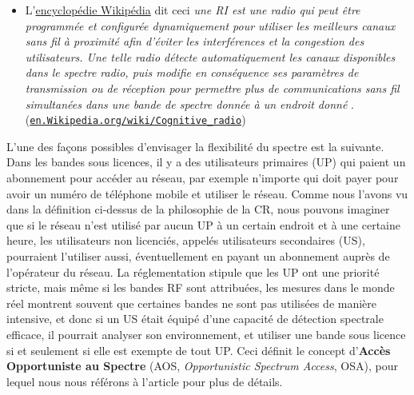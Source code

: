 \begin{resume_fr}
\begin{itemize}
    \item
    L'\href{https://en.wikipedia.org/wiki/Cognitive_radio}{encyclopédie Wikipédia} dit ceci
    \guillemotleft{} \emph{une RI est une radio qui peut être programmée et configurée dynamiquement pour utiliser les meilleurs canaux sans fil à proximité afin d'éviter les interférences et la congestion des utilisateurs. Une telle radio détecte automatiquement les canaux disponibles dans le spectre radio, puis modifie en conséquence ses paramètres de transmission ou de réception pour permettre plus de communications sans fil simultanées dans une bande de spectre donnée à un endroit donné} \guillemotright{}.
    (\href{https://en.wikipedia.org/wiki/Cognitive_radio}{\texttt{en.Wikipedia.org/wiki/Cognitive\_radio}})
\end{itemize}

L'une des façons possibles d'envisager la flexibilité du spectre est la suivante.
%
Dans les bandes sous licences, il y a des utilisateurs primaires (UP) qui paient un abonnement pour accéder au réseau, par exemple n'importe qui doit payer pour avoir un numéro de téléphone mobile et utiliser le réseau.
Comme nous l'avons vu dans la définition ci-dessus de la philosophie de la CR, nous pouvons imaginer que si le réseau n'est utilisé par aucun UP à un certain endroit et à une certaine heure, les utilisateurs non licenciés, appelés utilisateurs secondaires (US), pourraient l'utiliser aussi, éventuellement en payant un abonnement auprès de l'opérateur du réseau.
%
La réglementation stipule que les UP ont une priorité stricte,
mais même si les bandes RF sont attribuées, les mesures dans le monde réel montrent souvent que certaines bandes ne sont pas utilisées de manière intensive, et donc si un US était équipé d'une capacité de détection spectrale efficace, il pourrait analyser son environnement, et utiliser une bande sous licence si et seulement si elle est exempte de tout UP.
Ceci définit le concept d'\textbf{Accès Opportuniste au Spectre} (AOS, \emph{Opportunistic Spectrum Access}, OSA), pour lequel nous nous référons à l'article \cite{Zhao07} pour plus de détails.



\end{resume_fr}
